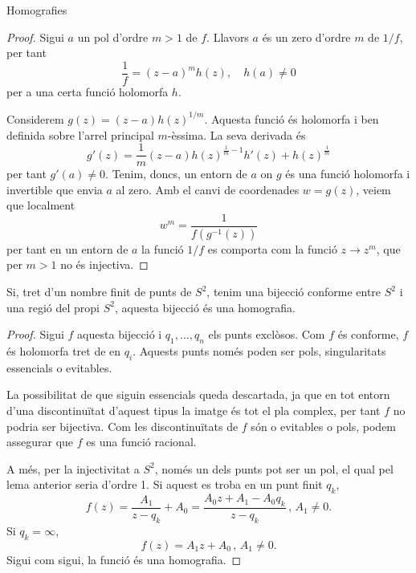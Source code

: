 \documentclass[dvipsnames, svgnames, leqno, a4paper, 12pt]{report}
\begin{document}
\begin{chapter}{Homografies}
\begin{proof}
            Sigui $a$ un pol d'ordre $m>1$ de $f$. Llavors $a$ és un zero d'ordre $m$ de $1/f$, per tant 
            \begin{displaymath}
                \frac{1}{f}=(z-a)^mh(z),\quad  h(a)\neq0
            \end{displaymath} 
            per a una certa funció holomorfa $h$.

            Considerem $ g(z)=(z-a)h(z)^{1/m}$. Aquesta funció és holomorfa i ben definida sobre l'arrel principal $m$-èssima. La seva derivada és 
            \begin{displaymath}
                g'(z)=\frac{1}{m}(z-a)h(z)^{\frac{1}{m}-1}h'(z)+h(z)^{\frac{1}{m}}
            \end{displaymath} 
            per tant $g'(a)\neq0$.
            Tenim, doncs, un entorn de $a$ on $g$ és una funció holomorfa i invertible que envia $a$ al zero. Amb el canvi de coordenades $ w  = g(z)$, veiem que localment \begin{displaymath}
                 w ^m = \frac{1}{f(g^{-1}(z))}
            \end{displaymath} 
            per tant en un entorn de $a$ la funció $1/f$ es comporta com la funció $z\to z^m$, que per $m>1$ no és injectiva.
        \end{proof}

        \begin{theorem}
            Si, tret d'un nombre finit de punts de $S^2$, tenim una bijecció conforme entre $S^2$ i una regió del propi $S^2$, aquesta bijecció és una homografia.
        \end{theorem}

        \begin{proof}
            Sigui $f$ aquesta bijecció i $q_1,\dots,q_n$ els punts exclòsos. Com $f$ és conforme, $f$ és holomorfa tret de en $q_i$. Aquests punts només poden ser pols, singularitats essencials o evitables. 
            
            La possibilitat de que siguin essencials queda descartada, ja que en tot entorn d'una discontinuïtat d'aquest tipus la imatge és tot el pla complex, per tant $f$ no podria ser bijectiva. Com les discontinuïtats de $f$ són o evitables o pols, podem assegurar que $f$ es una funció racional. 
            
            A més, per la injectivitat a $S^2$, només un dels punts pot ser un pol, el qual pel lema anterior seria d'ordre 1. Si aquest es troba en un punt finit $q_k$, \begin{displaymath}
                f(z)=\frac{A_1}{z-q_k}+A_0=\frac{A_0z+A_1-A_0q_k}{z-q_k}\,\text{, } A_1\neq0.
            \end{displaymath}
            Si $q_k=\infty$, 
            \begin{displaymath}
                f(z)=A_1z+A_0\, \text{, } A_1\neq0.
            \end{displaymath}
            Sigui com sigui, la funció és una homografia.
        \end{proof}


\end{chapter}
\end{document}
